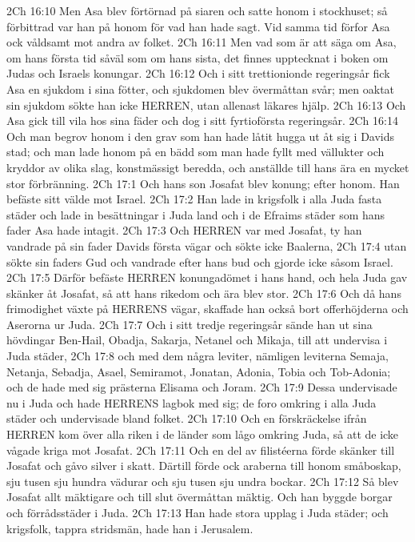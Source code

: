2Ch 16:10  Men Asa blev förtörnad på siaren och satte honom i stockhuset; så förbittrad var han på honom för vad han hade sagt. Vid samma tid förfor Asa ock våldsamt mot andra av folket.
2Ch 16:11  Men vad som är att säga om Asa, om hans första tid såväl som om hans sista, det finnes upptecknat i boken om Judas och Israels konungar.
2Ch 16:12  Och i sitt trettionionde regeringsår fick Asa en sjukdom i sina fötter, och sjukdomen blev övermåttan svår; men oaktat sin sjukdom sökte han icke HERREN, utan allenast läkares hjälp.
2Ch 16:13  Och Asa gick till vila hos sina fäder och dog i sitt fyrtioförsta regeringsår.
2Ch 16:14  Och man begrov honom i den grav som han hade låtit hugga ut åt sig i Davids stad; och man lade honom på en bädd som man hade fyllt med vällukter och kryddor av olika slag, konstmässigt beredda, och anställde till hans ära en mycket stor förbränning.
2Ch 17:1  Och hans son Josafat blev konung; efter honom. Han befäste sitt välde mot Israel.
2Ch 17:2  Han lade in krigsfolk i alla Juda fasta städer och lade in besättningar i Juda land och i de Efraims städer som hans fader Asa hade intagit.
2Ch 17:3  Och HERREN var med Josafat, ty han vandrade på sin fader Davids första vägar och sökte icke Baalerna,
2Ch 17:4  utan sökte sin faders Gud och vandrade efter hans bud och gjorde icke såsom Israel.
2Ch 17:5  Därför befäste HERREN konungadömet i hans hand, och hela Juda gav skänker åt Josafat, så att hans rikedom och ära blev stor.
2Ch 17:6  Och då hans frimodighet växte på HERRENS vägar, skaffade han också bort offerhöjderna och Aserorna ur Juda.
2Ch 17:7  Och i sitt tredje regeringsår sände han ut sina hövdingar Ben-Hail, Obadja, Sakarja, Netanel och Mikaja, till att undervisa i Juda städer,
2Ch 17:8  och med dem några leviter, nämligen leviterna Semaja, Netanja, Sebadja, Asael, Semiramot, Jonatan, Adonia, Tobia och Tob-Adonia; och de hade med sig prästerna Elisama och Joram.
2Ch 17:9  Dessa undervisade nu i Juda och hade HERRENS lagbok med sig; de foro omkring i alla Juda städer och undervisade bland folket.
2Ch 17:10  Och en förskräckelse ifrån HERREN kom över alla riken i de länder som lågo omkring Juda, så att de icke vågade kriga mot Josafat.
2Ch 17:11  Och en del av filistéerna förde skänker till Josafat och gåvo silver i skatt. Därtill förde ock araberna till honom småboskap, sju tusen sju hundra vädurar och sju tusen sju undra bockar.
2Ch 17:12  Så blev Josafat allt mäktigare och till slut övermåttan mäktig. Och han byggde borgar och förrådsstäder i Juda.
2Ch 17:13  Han hade stora upplag i Juda städer; och krigsfolk, tappra stridsmän, hade han i Jerusalem.

